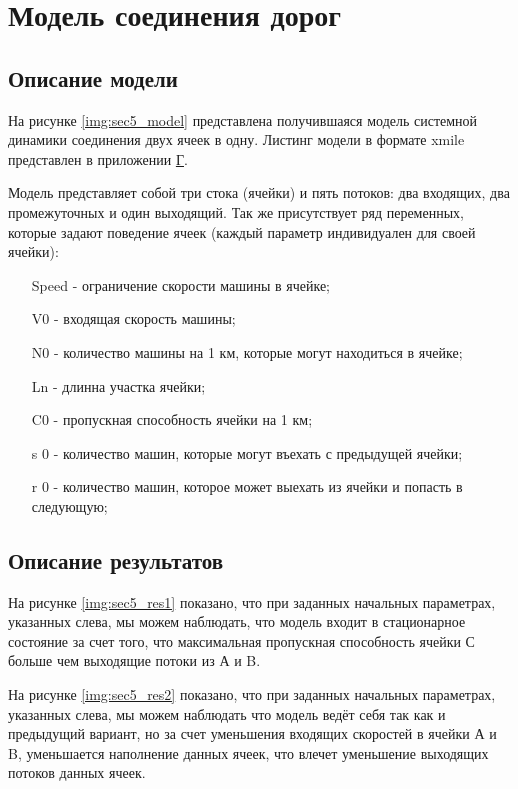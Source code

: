 \section{Модель соединения дорог}

\subsection{Описание модели}

На рисунке \ref{img:sec5_model} представлена получившаяся модель системной динамики соединения двух ячеек в одну. Листинг модели в формате xmile представлен в приложении \hyperlink{app-d}{Г}.

Модель представляет собой три стока (ячейки) и пять потоков: два входящих, два промежуточных и один выходящий.
Так же присутствует ряд переменных, которые задают поведение ячеек (каждый параметр индивидуален для своей ячейки):
\begin{itemize}
    \item[Speed] - ограничение скорости машины в ячейке;
    \item[V0] - входящая скорость машины;
    \item[N0] - количество машины на 1 км, которые могут находиться в ячейке;
    \item[Ln] - длинна участка ячейки;
    \item[C0] - пропускная способность ячейки на 1 км;
    \item[s 0] - количество машин, которые могут въехать с предыдущей ячейки;
    \item[r 0] - количество машин, которое может выехать из ячейки и попасть в следующую;
\end{itemize}


\subsection{Описание результатов}

На рисунке \ref{img:sec5_res1} показано, что при заданных начальных параметрах, указанных слева, мы можем наблюдать, что модель входит в стационарное состояние за счет того, что максимальная пропускная способность ячейки С больше чем выходящие потоки из А и B.


На рисунке \ref{img:sec5_res2} показано, что при заданных начальных параметрах, указанных слева, мы можем наблюдать что модель ведёт себя так как и предыдущий вариант, но за счет уменьшения входящих скоростей в ячейки А и B, уменьшается наполнение данных ячеек, что влечет уменьшение выходящих потоков данных ячеек. 

